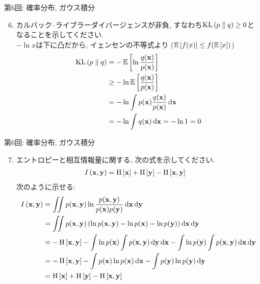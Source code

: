 \documentclass[dvipdfmx,notheorems,t]{beamer}
\begin{document}
\begin{frame}{第6回: 確率分布, ガウス積分}
\begin{enumerate}
  \setcounter{enumi}{5}
  \item カルバック--ライブラーダイバージェンスが非負, すなわち$\operatorname{KL} \left( p \parallel q \right) \ge 0$となることを示してください. \\
  $-\ln x$は下に凸だから, イェンセンの不等式より ($\operatorname{\mathbb{E}} \left[ f(x) \right] \le f(\operatorname{\mathbb{E}} \left[ x \right])$)
  \begin{align*}
    \operatorname{KL} \left( p \parallel q \right) &= -\operatorname{\mathbb{E}} \left[ \ln \frac{q(\vb{x})}{p(\vb{x})} \right] \\
      &\ge -\ln \operatorname{\mathbb{E}} \left[ \frac{q(\vb{x})}{p(\vb{x})} \right] \\
      &= -\ln \int p(\vb{x}) \frac{q(\vb{x})}{p(\vb{x})} \dd{\vb{x}} \\
      &= -\ln \int q(\vb{x}) \dd{\vb{x}} = -\ln 1 = 0
  \end{align*}
\end{enumerate}
\end{frame}

\begin{frame}{第6回: 確率分布, ガウス積分}
\begin{enumerate}
  \setcounter{enumi}{6}
  \item エントロピーと相互情報量に関する, 次の式を示してください.
  \begin{align*}
    I \left( \vb{x}, \vb{y} \right) &= \operatorname{H} \left[ \vb{x} \right] + \operatorname{H} \left[ \vb{y} \right] - \operatorname{H} \left[ \vb{x}, \vb{y} \right]
  \end{align*}
  次のように示せる:
  {\small \begin{align*}
    I \left( \vb{x}, \vb{y} \right) &= \iint p(\vb{x}, \vb{y})
      \ln \frac{p(\vb{x}, \vb{y})}{p(\vb{x}) p(\vb{y})} \dd{\vb{x}} \dd{\vb{y}} \\
      &= \iint p(\vb{x}, \vb{y}) \left( \ln p(\vb{x}, \vb{y}) - \ln p(\vb{x}) - \ln p(\vb{y}) \right)
        \dd{\vb{x}} \dd{\vb{y}} \\
      &= -\operatorname{H} \left[ \vb{x}, \vb{y} \right] - \int \ln p(\vb{x}) \int p(\vb{x}, \vb{y}) \dd{\vb{y}} \dd{\vb{x}}
        - \int \ln p(\vb{y}) \int p(\vb{x}, \vb{y}) \dd{\vb{x}} \dd{\vb{y}} \\
      &= -\operatorname{H} \left[ \vb{x}, \vb{y} \right] - \int p(\vb{x}) \ln p(\vb{x}) \dd{\vb{x}}
        - \int p(\vb{y}) \ln p(\vb{y}) \dd{\vb{y}} \\
      &= \operatorname{H} \left[ \vb{x} \right] + \operatorname{H} \left[ \vb{y} \right] - \operatorname{H} \left[ \vb{x}, \vb{y} \right]
  \end{align*}}
\end{enumerate}
\end{frame}
\end{document}
